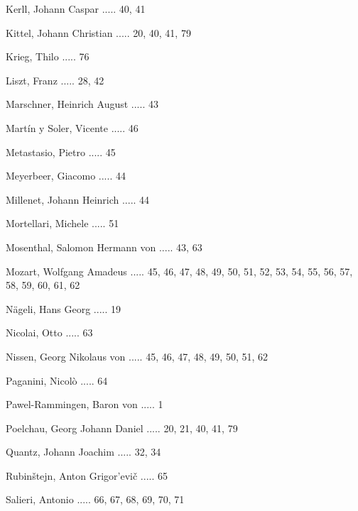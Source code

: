 \documentclass[a4paper, twocolumn, 11pt]{book}
\begin{document}
\newline 
Kerll, Johann Caspar ..... 40, 41

\newline 
Kittel, Johann Christian ..... 20, 40, 41, 79

\newline 
Krieg, Thilo ..... 76

\newline 
Liszt, Franz ..... 28, 42

\newline 
Marschner, Heinrich August ..... 43

\newline 
Martín y Soler, Vicente ..... 46

\newline 
Metastasio, Pietro ..... 45

\newline 
Meyerbeer, Giacomo ..... 44

\newline 
Millenet, Johann Heinrich ..... 44

\newline 
Mortellari, Michele ..... 51

\newline 
Mosenthal, Salomon Hermann von ..... 43, 63

\newline 
Mozart, Wolfgang Amadeus ..... 45, 46, 47, 48, 49, 50, 51, 52, 53, 54, 55, 56, 57, 58, 59, 60, 61, 62

\newline 
Nägeli, Hans Georg ..... 19

\newline 
Nicolai, Otto ..... 63

\newline 
Nissen, Georg Nikolaus von ..... 45, 46, 47, 48, 49, 50, 51, 62

\newline 
Paganini, Nicolò ..... 64

\newline 
Pawel-Rammingen, Baron von ..... 1

\newline 
Poelchau, Georg Johann Daniel ..... 20, 21, 40, 41, 79

\newline 
Quantz, Johann Joachim ..... 32, 34

\newline 
Rubinštejn, Anton Grigor'evič ..... 65

\newline 
Salieri, Antonio ..... 66, 67, 68, 69, 70, 71
\end{document}
